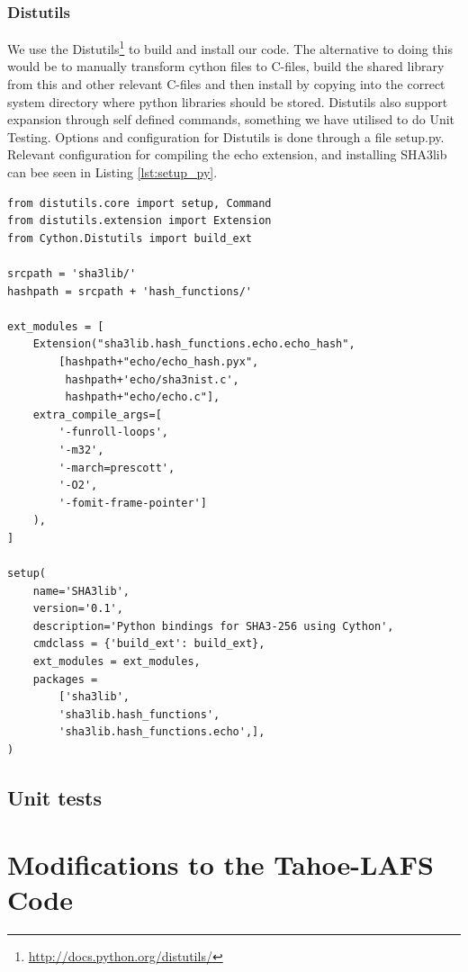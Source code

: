\documentclass[english,12pt,a4paper]{book}
\begin{document}
\subsubsection{\ac{Distutils}} We use the
\ac{Distutils}\footnote{\url{http://docs.python.org/distutils/}} to build and
install our code. The alternative to doing this would be to manually transform
cython files to C-files, build the shared library from this and other relevant
C-files and then install by copying into the correct system directory where
python libraries should be stored. \ac{Distutils} also support expansion
through self defined commands, something we have utilised to do Unit Testing.
Options and configuration for \ac{Distutils} is done through a file setup.py.
Relevant configuration for compiling the echo extension, and installing SHA3lib
can bee seen in Listing \ref{lst:setup_py}.


\begin{lstlisting}[label=lst:setup_py, caption=Compiling echo from \ac{Distutils}]
from distutils.core import setup, Command
from distutils.extension import Extension
from Cython.Distutils import build_ext

srcpath = 'sha3lib/'
hashpath = srcpath + 'hash_functions/'

ext_modules = [
    Extension("sha3lib.hash_functions.echo.echo_hash",
        [hashpath+"echo/echo_hash.pyx", 
         hashpath+'echo/sha3nist.c', 
         hashpath+"echo/echo.c"],
    extra_compile_args=[
        '-funroll-loops',
        '-m32',
        '-march=prescott',
        '-O2',
        '-fomit-frame-pointer']
    ),
]

setup(
    name='SHA3lib',
    version='0.1',
    description='Python bindings for SHA3-256 using Cython',
    cmdclass = {'build_ext': build_ext},
    ext_modules = ext_modules,
    packages =
        ['sha3lib',
        'sha3lib.hash_functions',
        'sha3lib.hash_functions.echo',],
)

\end{lstlisting}

\subsection{Unit tests}

\section{Modifications to the Tahoe-\ac{LAFS} Code}
\end{document}
